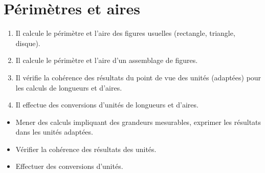 \themaM
\graphicspath{{../../S13_Perimetres_et_aires/Images/}}

\chapter{Périmètres et aires}
\label{S13}

\newcommand{\vg}{\psarc(3,0){2.24}{153.4}{-153.4}}
\newcommand{\vm}{\psline(1,-1)(1,1)}
\newcommand{\vd}{\psarc(-1,0){2.24}{-26.6}{26.6}}
\newcommand{\hb}{\psarc(0,3){2.24}{-116.6}{-63.4}}
\newcommand{\hm}{\psline(-1,1)(1,1)}
\newcommand{\hh}{\psarc(0,-1){2.24}{63.4}{116.6}}
 \newcommand{\curvica}[5]{\rput(#1,#2){#3} \rput(#1,#2){#4} \rput(#1,#2){\large #5}}  

\begin{autoeval}
   \small
   \begin{enumerate}
      \item Il calcule le périmètre et l’aire des figures usuelles (rectangle, triangle, disque).
      \item Il calcule le périmètre et l’aire d’un assemblage de figures.
      \item Il vérifie la cohérence des résultats du point de vue des unités (adaptées) pour les calculs de longueurs et d’aires.
      \item Il effectue des conversions d’unités de longueurs et d’aires.
   \end{enumerate}
\end{autoeval}

\begin{prerequis}
   \begin{itemize}
      \item[\com] Mener des calculs impliquant des grandeurs mesurables, exprimer les résultats dans les unités adaptées.
      \item[\com] Vérifier la cohérence des résultats des unités.
      \item[\com] Effectuer des conversions d’unités.
   \end{itemize}
\end{prerequis}

\vfill

